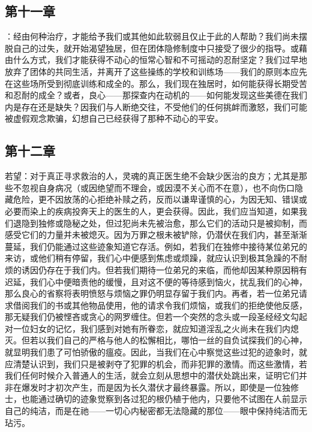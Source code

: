 \subsection{第十一章}

\par

：经由何种治疗，才能给予我们或其他如此软弱且仅止于此的人帮助？我们尚未摆脱自己的过失，就开始渴望独居，但在团体隐修制度中只接受了很少的指导。或藉由什么方式，我们才能获得不动心的恒常心智和不可摇动的忍耐坚定？我们过早地放弃了团体的共同生活，并离开了这些操练的学校和训练场——我们的原则本应先在这些场所受到彻底训练和成全的。那么，我们现在独居时，如何能获得长期受苦和忍耐的成全？或者，良心——那探查内在动机的——如何能发现这些美德在我们内是存在还是缺失？因我们与人断绝交往，不受他们的任何挑衅而激怒，我们可能被虚假观念欺骗，幻想自己已经获得了那种不动心的平安。\par


\subsection{第十二章}

\par

若望：对于真正寻求救治的人，灵魂的真正医生绝不会缺少医治的良方；尤其是那些不忽视自身病况（或因绝望而不理会，或因漠不关心而不在意），也不向伤口隐藏危险，更不因放荡的心拒绝补赎之药，反而以谦卑谨慎的心，为因无知、错误或必要而染上的疾病投奔天上的医生的人，更会获得。因此，我们应当知道，如果我们退隐到独修或隐秘之处，但过犯尚未先被治愈，那么它们的活动只是被抑制，而感受它们的力量并未被熄灭。因为万罪之根未被铲除，仍潜伏在我们内，甚至渐渐蔓延，我们仍能通过这些迹象知道它存活。例如，若我们在独修中接待某位弟兄的来访，或他们稍有停留，我们心中便感到焦虑或烦躁，就应认识到极其急躁的不耐烦的诱因仍存在于我们内。但若我们期待一位弟兄的来临，而他却因某种原因稍有迟延，我们心中便暗责他的缓慢，且对这不便的等待感到恼火，扰乱我们的心神，那么良心的省察将表明愤怒与烦恼之罪仍明显存留于我们内。再者，若一位弟兄请求借阅我们的书或其他物品使用，他的请求令我们烦恼，或我们的拒绝使他反感，那无疑我们仍被悭吝或贪心的网罗缠住。但若一个突然的念头或一段圣经经文勾起对一位妇女的记忆，我们感到对她有所眷恋，就应知道淫乱之火尚未在我们内熄灭。但若以我们自己的严格与他人的松懈相比，哪怕一丝的自负试探我们的心神，就显明我们患了可怕骄傲的瘟疫。因此，当我们在心中察觉这些过犯的迹象时，就应清楚认识到，我们只是被剥夺了犯罪的机会，而非犯罪的激情。而这些激情，若我们任何时候介入普通人的生活，就会立刻从思想中的潜伏处跳出来，证明它们并非在爆发时才初次产生，而是因为长久潜伏才最终暴露。所以，即使是一位独修士，也能通过确切的迹象觉察到各过犯的根仍植于他内，只要他不试图在人前显示自己的纯洁，而是在祂——一切心内秘密都无法隐藏的那位——眼中保持纯洁而无玷污。\par

